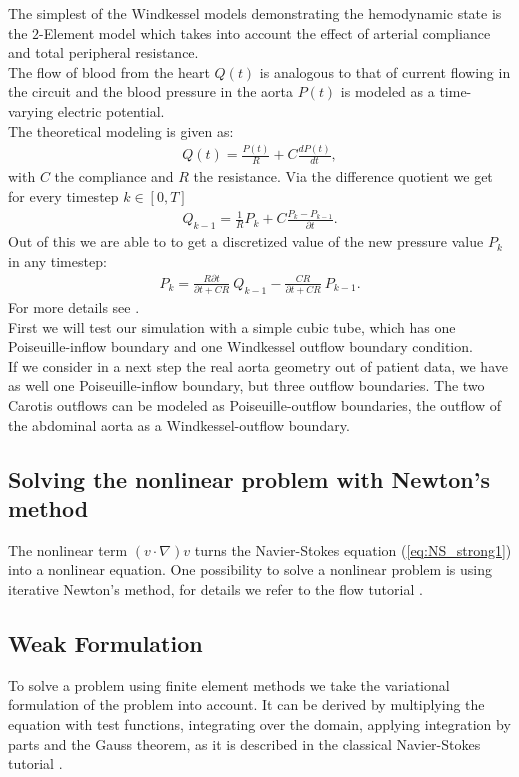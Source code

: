 \documentclass[a4paper, 11pt, twoside]{article}
\begin{document}
The simplest of the Windkessel models demonstrating the hemodynamic state is the $2$-Element model which takes into
account the effect of arterial compliance and total peripheral resistance.\\
The flow of blood from the heart $Q(t)$ is analogous to that of current flowing in the circuit and the blood pressure in the aorta
$P(t)$ is modeled as a time-varying electric potential. \\
The theoretical modeling is given as:
\begin{align}
 Q(t) = \frac{P(t)}{R} + C \frac{dP(t)}{dt},
\end{align}
with $C$ the compliance and $R$ the resistance.
Via the difference quotient we get for every timestep $k \in [0,T]$
\begin{align}
 Q_{k-1}=\frac{1}{R} P_k + C \frac{P_k-P_{k-1}}{\partial t}.
\end{align}
Out of this we are able to to get a discretized value of the new pressure value $P_k$ in any timestep:
\begin{align}
 P_k = \frac{R \partial t}{\partial t + CR}\ Q_{k-1} - \frac{CR}{\partial t + CR}\ P_{k-1}.
\end{align}
For more details see \cite{windkessel}.\\

First we will test our simulation with a simple cubic tube, which has one Poiseuille-inflow boundary and one Windkessel
outflow boundary condition.\\
If we consider in a next step the real aorta geometry out of patient data, we have as well one Poiseuille-inflow boundary,
but three outflow boundaries. 
The two Carotis outflows can be modeled as Poiseuille-outflow boundaries, the outflow of the abdominal aorta as a Windkessel-outflow boundary.\\

\subsection{Solving the nonlinear problem with Newton's method}
The nonlinear term $(v\cdot \nabla)v$ turns the Navier-Stokes equation (\ref{eq:NS_strong1}) into a nonlinear equation. One possibility 
to solve a nonlinear problem is using iterative Newton's method, for details we refer to the flow tutorial \cite{tutorial}.

\subsection{Weak Formulation}
To solve a problem using finite element methods we take the variational formulation of the problem into account. 
It can be derived by multiplying the equation with test functions, integrating over the domain, applying integration by parts and the Gauss theorem, as it is described in the 
classical Navier-Stokes tutorial \cite{tutorial}. 
\end{document}

